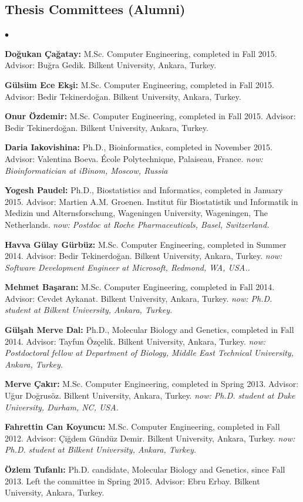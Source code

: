 \documentclass[margin,line]{res}
\newenvironment{list2}{
  \begin{list}{$\bullet$}{%
      \setlength{\itemsep}{0in}
      \setlength{\parsep}{0in} \setlength{\parskip}{0in}
      \setlength{\topsep}{0in} \setlength{\partopsep}{0in} 
      \setlength{\leftmargin}{0.2in}}}{\end{list}}
\begin{document}
\begin{resume}
\subsection{\small \sc Thesis Committees (Alumni)}
\begin{list2}
\item
  {\bf Doğukan Çağatay:} M.Sc. Computer Engineering, completed in Fall 2015. Advisor: Buğra Gedik.
  Bilkent University, Ankara, Turkey. 
\item
  {\bf Gülsüm Ece Ekşi:} M.Sc. Computer Engineering, completed in Fall 2015. Advisor: Bedir Tekinerdoğan.
  Bilkent University, Ankara, Turkey. 
\item
  {\bf Onur Özdemir:} M.Sc. Computer Engineering, completed in Fall 2015. Advisor: Bedir Tekinerdoğan.
  Bilkent University, Ankara, Turkey. 
\item
  {\bf Daria Iakovishina:} Ph.D., Bioinformatics, completed in November 2015.
  Advisor:  Valentina Boeva.
  École Polytechnique, Palaiseau, France.
  {\it now: Bioinformatician at iBinom, Moscow, Russia}
\item
  {\bf Yogesh Paudel:} Ph.D., Biostatistics and Informatics, completed in January 2015.
  Advisor: Martien A.M. Groenen.
  Institut für Biostatistik und Informatik in Medizin und Alternsforschung,  Wageningen University, Wageningen, The Netherlands.
  {\it now: Postdoc at Roche Pharmaceuticals, Basel, Switzerland.}
\item
  {\bf Havva Gülay Gürbüz:} M.Sc. Computer Engineering, completed in Summer 2014. Advisor: Bedir Tekinerdoğan.
  Bilkent University, Ankara, Turkey. 
  {\it now: Software Development Engineer at Microsoft, Redmond, WA, USA..}
\item
  {\bf Mehmet Başaran:} M.Sc. Computer Engineering, completed in Fall 2014. Advisor: Cevdet Aykanat.
  Bilkent University, Ankara, Turkey. {\it now: Ph.D. student at Bilkent University, Ankara, Turkey.}
\item
  {\bf G\"{u}l\c{s}ah Merve Dal:} Ph.D., Molecular Biology and Genetics, completed in Fall 2014.
  Advisor: Tayfun Özçelik.
  Bilkent University, Ankara, Turkey. {\it now: Postdoctoral fellow at Department of Biology, Middle East Technical University, Ankara, Turkey.}
\item
  {\bf Merve Çakır:} M.Sc. Computer Engineering, completed in Spring 2013. Advisor: Uğur Doğrusöz.
  Bilkent University, Ankara, Turkey. {\it now: Ph.D. student at Duke University, Durham, NC, USA.}
\item
  {\bf Fahrettin Can Koyuncu:} M.Sc. Computer Engineering, completed in Fall 2012. Advisor: Çiğdem Gündüz Demir.
  Bilkent University, Ankara, Turkey. {\it now: Ph.D. student at Bilkent University, Ankara, Turkey.}
\item
  {\bf Özlem Tufanlı:} Ph.D. candidate, Molecular Biology and Genetics, since Fall 2013. Left the committee in Spring 2015.
  Advisor: Ebru Erbay.
  Bilkent University, Ankara, Turkey.
  \end{list2}


\end{resume}
\end{document}
